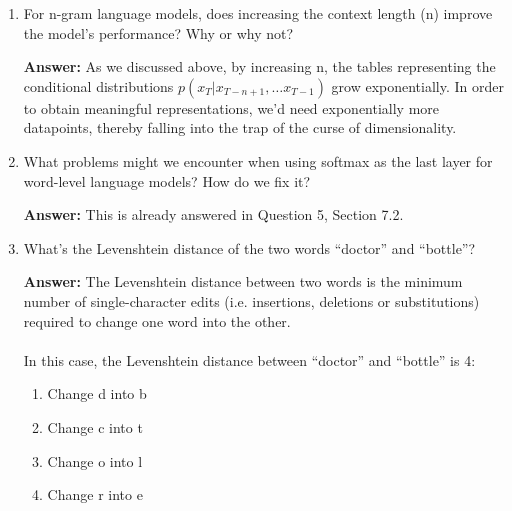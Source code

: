 \documentclass{article}
\newenvironment{QandA}{\begin{enumerate}[label=\arabic*.]}{\end{enumerate}}
\newenvironment{answer}{\par\normalfont \textbf{Answer:}}{}
\newcommand{\g}{\vert}
\begin{document}
\begin{QandA}
    \item For n-gram language models, does increasing the context length (n) improve the model’s performance? Why or why not?
    \begin{answer}
        As we discussed above, by increasing n, the tables representing the conditional distributions $p(x_T \g x_{T-n+1}, \ldots x_{T-1})$ grow exponentially. In order to obtain meaningful representations, we'd need exponentially more datapoints, thereby falling into the trap of the curse of dimensionality.
    \end{answer}

    \item What problems might we encounter when using softmax as the last layer for word-level language models? How do we fix it?
    \begin{answer}
        This is already answered in Question 5, Section 7.2.
    \end{answer}

    \item What's the Levenshtein distance of the two words ``doctor'' and ``bottle''?
    \begin{answer}
         The Levenshtein distance between two words is the minimum number of single-character edits (i.e. insertions, deletions or substitutions) required to change one word into the other.\\\\
         In this case, the Levenshtein distance between ``doctor'' and ``bottle'' is 4:
         \begin{enumerate}[label=\arabic*.]
             \item Change d into b 
             \item Change c into t
             \item Change o into l
             \item Change r into e
         \end{enumerate}
    \end{answer}


\end{QandA}
\end{document}
